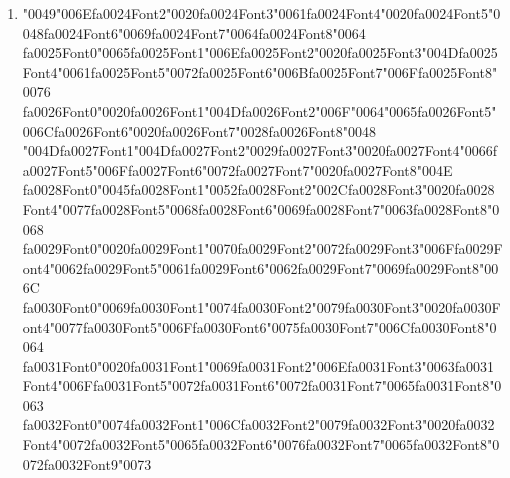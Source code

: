 \documentclass[12pt]{article}
\begin{document}
\begin{enumerate}[label=Q\arabic*.]
\item {\char"0049}{\char"006E}{\csname fa0024Font2\endcsname\char"0020}{\csname fa0024Font3\endcsname\char"0061}{\csname fa0024Font4\endcsname\char"0020}{\csname fa0024Font5\endcsname\char"0048}{\csname fa0024Font6\endcsname\char"0069}{\csname fa0024Font7\endcsname\char"0064}{\csname fa0024Font8\endcsname\char"0064} {\csname fa0025Font0\endcsname\char"0065}{\csname fa0025Font1\endcsname\char"006E}{\csname fa0025Font2\endcsname\char"0020}{\csname fa0025Font3\endcsname\char"004D}{\csname fa0025Font4\endcsname\char"0061}{\csname fa0025Font5\endcsname\char"0072}{\csname fa0025Font6\endcsname\char"006B}{\csname fa0025Font7\endcsname\char"006F}{\csname fa0025Font8\endcsname\char"0076} {\csname fa0026Font0\endcsname\char"0020}{\csname fa0026Font1\endcsname\char"004D}{\csname fa0026Font2\endcsname\char"006F}{\char"0064}{\char"0065}{\csname fa0026Font5\endcsname\char"006C}{\csname fa0026Font6\endcsname\char"0020}{\csname fa0026Font7\endcsname\char"0028}{\csname fa0026Font8\endcsname\char"0048} {\char"004D}{\csname fa0027Font1\endcsname\char"004D}{\csname fa0027Font2\endcsname\char"0029}{\csname fa0027Font3\endcsname\char"0020}{\csname fa0027Font4\endcsname\char"0066}{\csname fa0027Font5\endcsname\char"006F}{\csname fa0027Font6\endcsname\char"0072}{\csname fa0027Font7\endcsname\char"0020}{\csname fa0027Font8\endcsname\char"004E} {\csname fa0028Font0\endcsname\char"0045}{\csname fa0028Font1\endcsname\char"0052}{\csname fa0028Font2\endcsname\char"002C}{\csname fa0028Font3\endcsname\char"0020}{\csname fa0028Font4\endcsname\char"0077}{\csname fa0028Font5\endcsname\char"0068}{\csname fa0028Font6\endcsname\char"0069}{\csname fa0028Font7\endcsname\char"0063}{\csname fa0028Font8\endcsname\char"0068} {\csname fa0029Font0\endcsname\char"0020}{\csname fa0029Font1\endcsname\char"0070}{\csname fa0029Font2\endcsname\char"0072}{\csname fa0029Font3\endcsname\char"006F}{\csname fa0029Font4\endcsname\char"0062}{\csname fa0029Font5\endcsname\char"0061}{\csname fa0029Font6\endcsname\char"0062}{\csname fa0029Font7\endcsname\char"0069}{\csname fa0029Font8\endcsname\char"006C} {\csname fa0030Font0\endcsname\char"0069}{\csname fa0030Font1\endcsname\char"0074}{\csname fa0030Font2\endcsname\char"0079}{\csname fa0030Font3\endcsname\char"0020}{\csname fa0030Font4\endcsname\char"0077}{\csname fa0030Font5\endcsname\char"006F}{\csname fa0030Font6\endcsname\char"0075}{\csname fa0030Font7\endcsname\char"006C}{\csname fa0030Font8\endcsname\char"0064} {\csname fa0031Font0\endcsname\char"0020}{\csname fa0031Font1\endcsname\char"0069}{\csname fa0031Font2\endcsname\char"006E}{\csname fa0031Font3\endcsname\char"0063}{\csname fa0031Font4\endcsname\char"006F}{\csname fa0031Font5\endcsname\char"0072}{\csname fa0031Font6\endcsname\char"0072}{\csname fa0031Font7\endcsname\char"0065}{\csname fa0031Font8\endcsname\char"0063} {\csname fa0032Font0\endcsname\char"0074}{\csname fa0032Font1\endcsname\char"006C}{\csname fa0032Font2\endcsname\char"0079}{\csname fa0032Font3\endcsname\char"0020}{\csname fa0032Font4\endcsname\char"0072}{\csname fa0032Font5\endcsname\char"0065}{\csname fa0032Font6\endcsname\char"0076}{\csname fa0032Font7\endcsname\char"0065}{\csname fa0032Font8\endcsname\char"0072}{\csname fa0032Font9\endcsname\char"0073} 
\end{enumerate}
\end{document}
